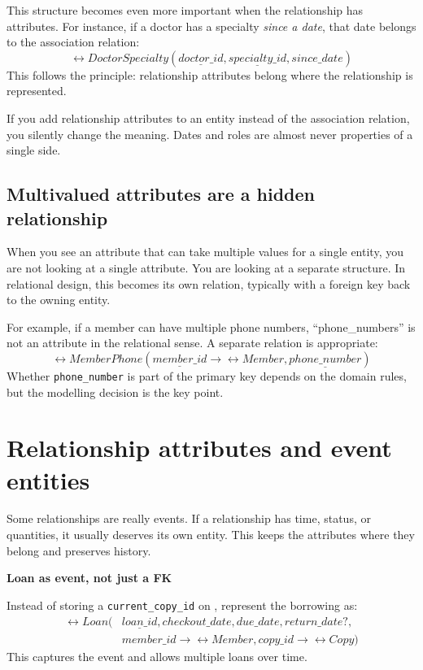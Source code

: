 This structure becomes even more important when the relationship has attributes.
For instance, if a doctor has a specialty \emph{since a date}, that date belongs to the association relation:
\[
\rel{DoctorSpecialty}(\underline{doctor\_id}, \underline{specialty\_id}, since\_date)
\]
This follows the principle: relationship attributes belong where the relationship is represented.

\begin{notebox}
If you add relationship attributes to an entity instead of the association relation, you silently change the meaning.
Dates and roles are almost never properties of a single side.
\end{notebox}

\subsection{Multivalued attributes are a hidden relationship}
When you see an attribute that can take multiple values for a single entity, you are not looking at a single attribute.
You are looking at a separate structure.
In relational design, this becomes its own relation, typically with a foreign key back to the owning entity.

For example, if a member can have multiple phone numbers, “phone\_numbers” is not an attribute in the relational sense.
A separate relation is appropriate:
\[
\rel{MemberPhone}(\underline{member\_id} \rightarrow \rel{Member}, \underline{phone\_number})
\]
Whether \texttt{phone\_number} is part of the primary key depends on the domain rules, but the modelling decision is the key point.

\section{Relationship attributes and event entities}
Some relationships are really events.
If a relationship has time, status, or quantities, it usually deserves its own entity.
This keeps the attributes where they belong and preserves history.

\begin{examplebox}
\textbf{Loan as event, not just a FK}\par\smallskip
Instead of storing a \texttt{current\_copy\_id} on , represent the borrowing as:
\[
\begin{aligned}
\rel{Loan}(&\underline{loan\_id}, checkout\_date, due\_date, return\_date?, \\
&member\_id \rightarrow \rel{Member}, copy\_id \rightarrow \rel{Copy})
\end{aligned}
\]
This captures the event and allows multiple loans over time.
\end{examplebox}

